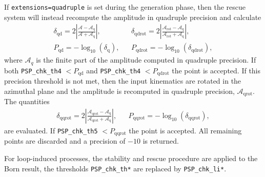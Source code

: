If \texttt{extensions=quadruple} is set during the \gosam generation phase, then the rescue system will instead recompute the amplitude in quadruple precision and calculate
\begin{align}
&\delta_\mathrm{qd} = 2 \left| \frac{\mathcal{A}-\mathcal{A}_\mathrm{q}}{\mathcal{A}+\mathcal{A}_\mathrm{q}} \right|,&
&\delta_\mathrm{qdrot} = 2 \left| \frac{\mathcal{A}_\mathrm{rot}-\mathcal{A}_\mathrm{q}}{\mathcal{A}_\mathrm{rot}+\mathcal{A}_\mathrm{q}} \right|, & \\
&P_\mathrm{qd} = -\log_\mathrm{10}(\delta_\mathrm{q}),&
&P_\mathrm{qdrot} = -\log_\mathrm{10}(\delta_\mathrm{qdrot}),&
\end{align}
where $\mathcal{A}_q$ is the finite part of the amplitude computed in quadruple precision.
If both \texttt{PSP\_chk\_th4} $< P_\mathrm{qd}$ and \texttt{PSP\_chk\_th4} $< P_\mathrm{qdrot}$ the point is accepted.
If this precision threshold is not met, then the input kinematics are rotated in the azimuthal plane and the amplitude is recomputed in quadruple precision, $\mathcal{A}_\mathrm{qrot}$.
The quantities
\begin{align}
&\delta_\mathrm{qqrot} = 2 \left| \frac{\mathcal{A}_\mathrm{qrot}-\mathcal{A}_\mathrm{q}}{\mathcal{A}_\mathrm{qrot}+\mathcal{A}_\mathrm{q}} \right|,&
&P_\mathrm{qqrot} = -\log_\mathrm{10}(\delta_\mathrm{qqrot}),&
\end{align}
are evaluated.
If \texttt{PSP\_chk\_th5} $< P_\mathrm{qqrot}$ the point is accepted. 
All remaining points are discarded and a precision of $-10$ is returned.

For loop-induced processes, the stability and rescue procedure are applied to the Born result, the thresholds \texttt{PSP\_chk\_th*} are replaced by \texttt{PSP\_chk\_li*}.